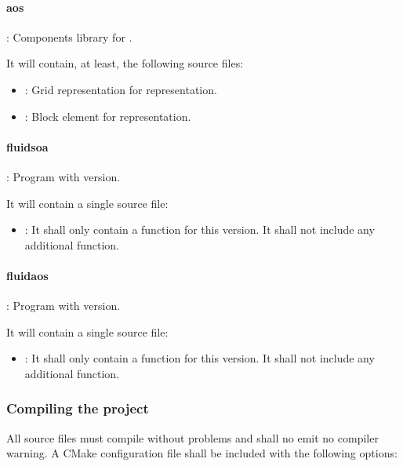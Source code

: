 \paragraph{aos}: Components library for .

It will contain, at least, the following source files:
\begin{itemize}
  \item {}: 
        Grid representation for  representation.
  \item {}: 
        Block element for  representation.
\end{itemize}

\paragraph{fluidsoa}: Program with  version.

It will contain a single source file:
\begin{itemize}
  \item {}: 
        It shall only contain a  function for this version.
        It shall not include any additional function.
\end{itemize}

\paragraph{fluidaos}: Program with  version.

It will contain a single source file:
\begin{itemize}
  \item {}: 
        It shall only contain a  function for this version.
        It shall not include any additional function.
\end{itemize}

\subsubsection{Compiling the project}

All source files must compile without problems and shall no emit no compiler warning.
A CMake configuration file shall be included with the following options:

